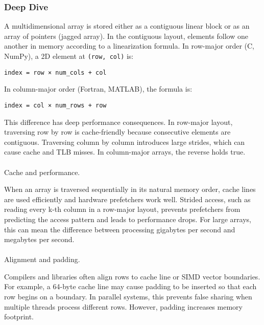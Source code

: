 \documentclass[
  letterpaper,
  DIV=11,
  numbers=noendperiod]{scrreprt}
\makeatletter
\let\oldparagraph\paragraph
\renewcommand{\paragraph}{
    \@ifstar
      \xxxParagraphStar
      \xxxParagraphNoStar
  }
\newcommand{\xxxParagraphStar}[1]{\oldparagraph*{#1}\mbox{}}
\newcommand{\xxxParagraphNoStar}[1]{\oldparagraph{#1}\mbox{}}
\makeatother
\begin{document}
\subsubsection{Deep Dive}\label{deep-dive-14}

A multidimensional array is stored either as a contiguous linear block
or as an array of pointers (jagged array). In the contiguous layout,
elements follow one another in memory according to a linearization
formula. In row-major order (C, NumPy), a 2D element at
\texttt{(row,\ col)} is:

\begin{verbatim}
index = row × num_cols + col
\end{verbatim}

In column-major order (Fortran, MATLAB), the formula is:

\begin{verbatim}
index = col × num_rows + row
\end{verbatim}

This difference has deep performance consequences. In row-major layout,
traversing row by row is cache-friendly because consecutive elements are
contiguous. Traversing column by column introduces large strides, which
can cause cache and TLB misses. In column-major arrays, the reverse
holds true.

\paragraph{Cache and performance.}\label{cache-and-performance.}

When an array is traversed sequentially in its natural memory order,
cache lines are used efficiently and hardware prefetchers work well.
Strided access, such as reading every k-th column in a row-major layout,
prevents prefetchers from predicting the access pattern and leads to
performance drops. For large arrays, this can mean the difference
between processing gigabytes per second and megabytes per second.

\paragraph{Alignment and padding.}\label{alignment-and-padding.}

Compilers and libraries often align rows to cache line or SIMD vector
boundaries. For example, a 64-byte cache line may cause padding to be
inserted so that each row begins on a boundary. In parallel systems,
this prevents false sharing when multiple threads process different
rows. However, padding increases memory footprint.
\end{document}
